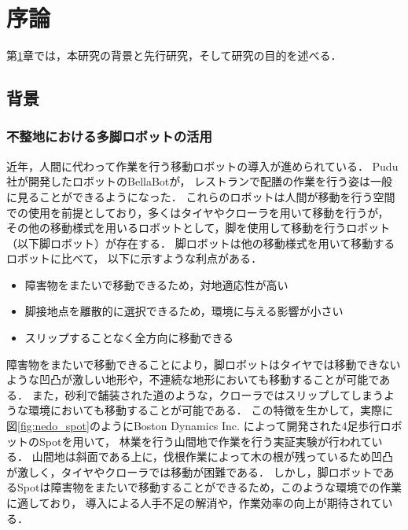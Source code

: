 ﻿
\chapter{序論}\label{chapter:序論}
第\ref{chapter:序論}章では，本研究の背景と先行研究，そして研究の目的を述べる．


\section{背景}


\subsection{不整地における多脚ロボットの活用}
近年，人間に代わって作業を行う移動ロボットの導入が進められている\cite{Sotnik_Prospects_for_Introduction}．
Pudu社が開発したロボットのBellaBot\cite{Pudu_BellaBot}が，
レストランで配膳の作業を行う姿は一般に見ることができるようになった．
これらのロボットは人間が移動を行う空間での使用を前提としており，多くはタイヤやクローラを用いて移動を行うが，
その他の移動様式を用いるロボットとして，脚を使用して移動を行うロボット（以下脚ロボット）が存在する．
脚ロボットは他の移動様式を用いて移動するロボットに比べて，
以下に示すような利点がある\cite{Locomotion_for_difficult_terrain}．

\begin{itemize}
  \item 障害物をまたいで移動できるため，対地適応性が高い
  \item 脚接地点を離散的に選択できるため，環境に与える影響が小さい
  \item スリップすることなく全方向に移動できる
\end{itemize}

障害物をまたいで移動できることにより，脚ロボットはタイヤでは移動できないような凹凸が激しい地形や，不連続な地形においても移動することが可能である．
また，砂利で舗装された道のような，クローラではスリップしてしまうような環境においても移動することが可能である．
この特徴を生かして，実際に図\ref{fig:nedo_spot}のようにBoston Dynamics Inc. によって開発された4足歩行ロボットのSpot\cite{Boston_Dynamics_Spot}を用いて，
林業を行う山間地で作業を行う実証実験が行われている\cite{NEDO}．
山間地は斜面である上に，伐根作業によって木の根が残っているため凹凸が激しく，タイヤやクローラでは移動が困難である．
しかし，脚ロボットであるSpotは障害物をまたいで移動することができるため，このような環境での作業に適しており，
導入による人手不足の解消や，作業効率の向上が期待されている．

